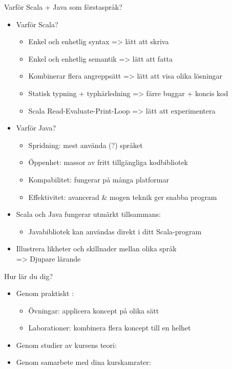 \begin{Slide}{Varför Scala + Java som förstaspråk?}
\begin{itemize}
\item Varför Scala?
\begin{itemize}
\item Enkel och enhetlig syntax => lätt att skriva
\item Enkel och enhetlig semantik => lätt att fatta
\item Kombinerar flera angreppsätt => lätt att visa olika lösningar
\item Statisk typning + typhärledning =>  färre buggar + koncis kod
\item Scala Read-Evaluate-Print-Loop => lätt att experimentera
\end{itemize}

\pause
\item Varför Java?
\begin{itemize}
\item Spridning: mest använda (?) språket
\item Öppenhet: massor av fritt tillgängliga kodbibliotek
\item Kompabilitet: fungerar på många platformar
\item Effektivitet: avancerad \& mogen teknik ger snabba program
\end{itemize}
\item Scala och Java fungerar utmärkt tillsammans:
\begin{itemize}
\item Javabibliotek kan användas direkt i ditt Scala-program
\end{itemize}

\item Illustrera likheter och skillnader mellan olika språk \\ => Djupare lärande
\end{itemize}
\end{Slide}


\begin{Slide}{Hur lär du dig?}
\begin{itemize}
\item Genom praktiskt : 
\begin{itemize}
\item Övningar: applicera koncept på olika sätt
\item Laborationer: kombinera flera koncept till en helhet
\end{itemize}
\item Genom studier av kursens teori: 
\item Genom samarbete med dina kurskamrater: 
\end{itemize}
\end{Slide}


